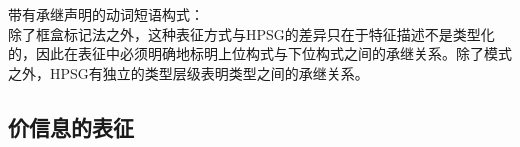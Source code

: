 \ea
带有承继声明的动词短语构式：\\
\setlength{\fboxsep}{2mm}
\z
除了框盒标记法之外，这种表征方式与HPSG的差异只在于特征描述不是类型化的，因此在表征中必须明确地标明上位构式与下位构式之间的承继关系。除了模式之外，HPSG有独立的类型层级表明类型之间的承继关系。

\subsection{价信息的表征}

